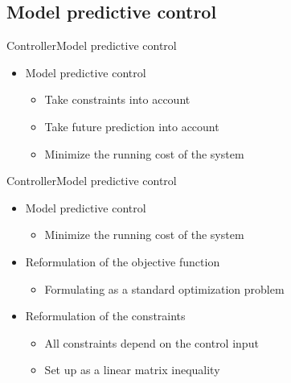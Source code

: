 \subsection{Model predictive control}

\begin{frame}{Controller}{Model predictive control}
\begin{itemize}
	\item<1-> Model predictive control 
	 	\begin{itemize}
	 	\item<1-> Take constraints into account	
	 	\item<1-> Take future prediction into account 
	 	\item<1-> Minimize the running cost of the system
	 	\end{itemize}
\end{itemize}
\end{frame}




\begin{frame}{Controller}{Model predictive control}

\begin{itemize}
	\item<1-> Model predictive control 
	 	\begin{itemize}
	 	\item<1-> Minimize the running cost of the system
	 	\end{itemize}
	\item<2-> Reformulation of the objective function 
	 	\begin{itemize}
	 	\item<2-> Formulating as a standard optimization problem 
	 	\end{itemize}
	\item<2-> Reformulation of the constraints 
	 	\begin{itemize}
	 	\item<2-> All constraints depend on the control input 
	 	\item<2-> Set up as a linear matrix inequality 
	 	\end{itemize}
\end{itemize}

\end{frame}

